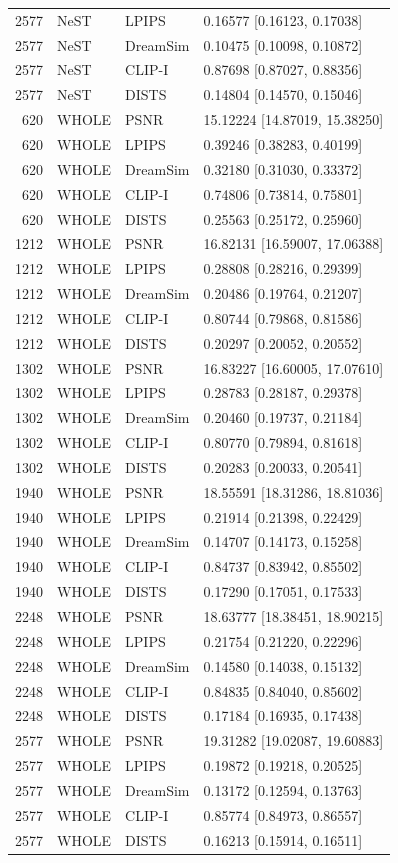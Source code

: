\documentclass[10pt,letterpaper]{article}
\begin{document}
\begin{longtable}{@{}rlll@{}}
2577 & NeST & LPIPS & 0.16577 [0.16123, 0.17038]\\
2577 & NeST & DreamSim & 0.10475 [0.10098, 0.10872]\\
2577 & NeST & CLIP-I & 0.87698 [0.87027, 0.88356]\\
2577 & NeST & DISTS & 0.14804 [0.14570, 0.15046]\\
620 & WHOLE & PSNR & 15.12224 [14.87019, 15.38250]\\
620 & WHOLE & LPIPS & 0.39246 [0.38283, 0.40199]\\
620 & WHOLE & DreamSim & 0.32180 [0.31030, 0.33372]\\
620 & WHOLE & CLIP-I & 0.74806 [0.73814, 0.75801]\\
620 & WHOLE & DISTS & 0.25563 [0.25172, 0.25960]\\
1212 & WHOLE & PSNR & 16.82131 [16.59007, 17.06388]\\
1212 & WHOLE & LPIPS & 0.28808 [0.28216, 0.29399]\\
1212 & WHOLE & DreamSim & 0.20486 [0.19764, 0.21207]\\
1212 & WHOLE & CLIP-I & 0.80744 [0.79868, 0.81586]\\
1212 & WHOLE & DISTS & 0.20297 [0.20052, 0.20552]\\
1302 & WHOLE & PSNR & 16.83227 [16.60005, 17.07610]\\
1302 & WHOLE & LPIPS & 0.28783 [0.28187, 0.29378]\\
1302 & WHOLE & DreamSim & 0.20460 [0.19737, 0.21184]\\
1302 & WHOLE & CLIP-I & 0.80770 [0.79894, 0.81618]\\
1302 & WHOLE & DISTS & 0.20283 [0.20033, 0.20541]\\
1940 & WHOLE & PSNR & 18.55591 [18.31286, 18.81036]\\
1940 & WHOLE & LPIPS & 0.21914 [0.21398, 0.22429]\\
1940 & WHOLE & DreamSim & 0.14707 [0.14173, 0.15258]\\
1940 & WHOLE & CLIP-I & 0.84737 [0.83942, 0.85502]\\
1940 & WHOLE & DISTS & 0.17290 [0.17051, 0.17533]\\
2248 & WHOLE & PSNR & 18.63777 [18.38451, 18.90215]\\
2248 & WHOLE & LPIPS & 0.21754 [0.21220, 0.22296]\\
2248 & WHOLE & DreamSim & 0.14580 [0.14038, 0.15132]\\
2248 & WHOLE & CLIP-I & 0.84835 [0.84040, 0.85602]\\
2248 & WHOLE & DISTS & 0.17184 [0.16935, 0.17438]\\
2577 & WHOLE & PSNR & 19.31282 [19.02087, 19.60883]\\
2577 & WHOLE & LPIPS & 0.19872 [0.19218, 0.20525]\\
2577 & WHOLE & DreamSim & 0.13172 [0.12594, 0.13763]\\
2577 & WHOLE & CLIP-I & 0.85774 [0.84973, 0.86557]\\
2577 & WHOLE & DISTS & 0.16213 [0.15914, 0.16511]\\
\bottomrule\end{longtable}
\end{document}
